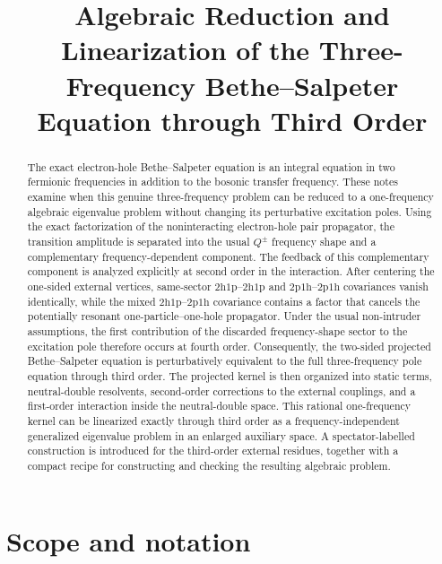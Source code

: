 \documentclass[aip,jcp,reprint,noshowkeys,superscriptaddress]{revtex4-1}
\newcommand{\hhp}{\text{2h1p}}
\newcommand{\pph}{\text{2p1h}}
\newcommand{\LCPQ}{Laboratoire de Chimie et Physique Quantiques (UMR 5626), Universit\'e de Toulouse, CNRS, UPS, France}
\begin{document}
\title{Algebraic Reduction and Linearization of the Three-Frequency Bethe--Salpeter Equation through Third Order}


\begin{abstract}
The exact electron-hole Bethe--Salpeter equation is an integral equation in two fermionic frequencies in addition to the bosonic transfer frequency.
These notes examine when this genuine three-frequency problem can be reduced to a one-frequency algebraic eigenvalue problem without changing its perturbative excitation poles.
Using the exact factorization of the noninteracting electron-hole pair propagator, the transition amplitude is separated into the usual $Q^\pm$ frequency shape and a complementary frequency-dependent component.
The feedback of this complementary component is analyzed explicitly at second order in the interaction.
After centering the one-sided external vertices, same-sector $\hhp$--$\hhp$ and $\pph$--$\pph$ covariances vanish identically, while the mixed $\hhp$--$\pph$ covariance contains a factor that cancels the potentially resonant one-particle--one-hole propagator.
Under the usual non-intruder assumptions, the first contribution of the discarded frequency-shape sector to the excitation pole therefore occurs at fourth order.
Consequently, the two-sided projected Bethe--Salpeter equation is perturbatively equivalent to the full three-frequency pole equation through third order.
The projected kernel is then organized into static terms, neutral-double resolvents, second-order corrections to the external couplings, and a first-order interaction inside the neutral-double space.
This rational one-frequency kernel can be linearized exactly through third order as a frequency-independent generalized eigenvalue problem in an enlarged auxiliary space.
A spectator-labelled construction is introduced for the third-order external residues, together with a compact recipe for constructing and checking the resulting algebraic problem.
\end{abstract}

\maketitle

\onecolumngrid
\tableofcontents
\twocolumngrid

\section{Scope and notation}
\label{sec:scope}
\end{document}
